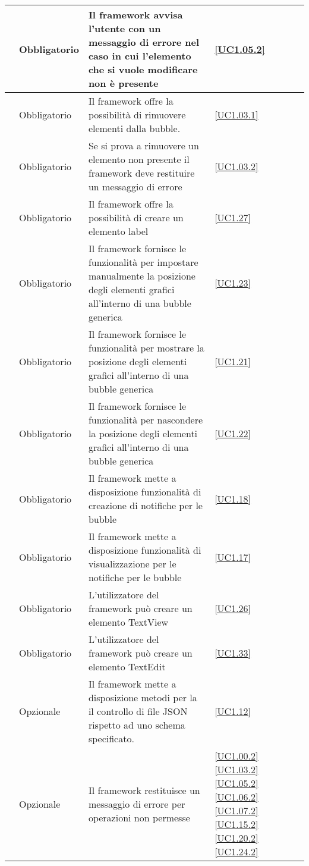 \begin{longtable}{|P{1.5cm}|P{2.5cm}|P{6.5cm}|P{2.5cm}|}
	\hline \RequisitoObF\label{L89} & Obbligatorio & Il framework avvisa l'utente con un messaggio di errore nel caso in cui l'elemento che si vuole modificare non è presente & \ref{UC1.05.2} \\
	\hline \RequisitoObF\label{L55} & Obbligatorio & Il framework offre la possibilità di rimuovere elementi dalla bubble. & \ref{UC1.03.1} \\
	\hline \RequisitoObF\label{L88} & Obbligatorio & Se si prova a rimuovere un elemento non presente il framework deve restituire un messaggio di errore & \ref{UC1.03.2} \\
	\hline \RequisitoObF\label{L12} & Obbligatorio & Il framework offre la possibilità di creare un elemento label & \ref{UC1.27} \\
	\hline \RequisitoObF\label{L13} & Obbligatorio & Il framework fornisce le funzionalità per impostare manualmente la posizione degli elementi grafici all'interno di una bubble generica & \ref{UC1.23} \\
	\hline \RequisitoObF\label{L14} & Obbligatorio & Il framework fornisce le funzionalità per mostrare la posizione degli elementi grafici all'interno di una bubble generica & \ref{UC1.21} \\
	\hline \RequisitoObF\label{L63} & Obbligatorio & Il framework fornisce le funzionalità per nascondere la posizione degli elementi grafici all'interno di una bubble generica &  \ref{UC1.22} \\
	\hline \RequisitoObF\label{L15} & Obbligatorio & Il framework mette a disposizione funzionalità di creazione di notifiche per le bubble & \ref{UC1.18} \\
	\hline \RequisitoObF\label{L16} & Obbligatorio & Il framework mette a disposizione funzionalità di visualizzazione per le notifiche per le bubble & \ref{UC1.17} \\
	\hline \RequisitoObF\label{L33} & Obbligatorio & L'utilizzatore del framework può creare un elemento TextView & \ref{UC1.26} \\
	\hline \RequisitoObF\label{L34} & Obbligatorio & L'utilizzatore del framework può creare un elemento TextEdit & \ref{UC1.33} \\
	\hline \RequisitoOpF\label{L35} & Opzionale & Il framework mette a disposizione metodi per la il controllo di file JSON rispetto ad uno schema specificato. & \ref{UC1.12} \\
	\hline \RequisitoOpF\label{L94} & Opzionale & Il framework restituisce un messaggio di errore per operazioni non permesse & \ref{UC1.00.2} \ref{UC1.03.2} \ref{UC1.05.2} \ref{UC1.06.2} \ref{UC1.07.2} \ref{UC1.15.2} \ref{UC1.20.2} \ref{UC1.24.2} \\

\end{longtable}
